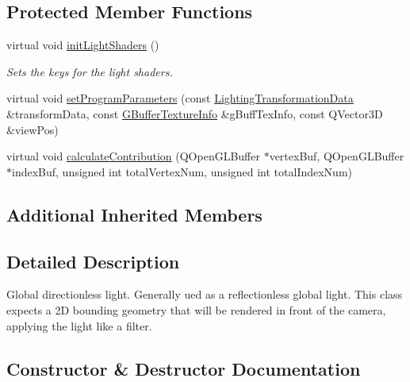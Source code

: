 \subsection*{Protected Member Functions}
\begin{DoxyCompactItemize}
\item 
\mbox{\label{class_geometry_engine_1_1_geometry_world_item_1_1_geometry_light_1_1_ambient_light_a0d27aaf4867e35c545f572ff2cf8c251}} 
virtual void \mbox{\hyperlink{class_geometry_engine_1_1_geometry_world_item_1_1_geometry_light_1_1_ambient_light_a0d27aaf4867e35c545f572ff2cf8c251}{init\+Light\+Shaders}} ()
\begin{DoxyCompactList}\small\item\em Sets the keys for the light shaders. \end{DoxyCompactList}\item 
virtual void \mbox{\hyperlink{class_geometry_engine_1_1_geometry_world_item_1_1_geometry_light_1_1_ambient_light_a37469f72317d3d9cd0e5fb46fbf5fedf}{set\+Program\+Parameters}} (const \mbox{\hyperlink{struct_geometry_engine_1_1_lighting_transformation_data}{Lighting\+Transformation\+Data}} \&transform\+Data, const \mbox{\hyperlink{struct_geometry_engine_1_1_g_buffer_texture_info}{G\+Buffer\+Texture\+Info}} \&g\+Buff\+Tex\+Info, const Q\+Vector3D \&view\+Pos)
\item 
virtual void \mbox{\hyperlink{class_geometry_engine_1_1_geometry_world_item_1_1_geometry_light_1_1_ambient_light_a4f1d4fb9ad25626e15c28de03b610b4f}{calculate\+Contribution}} (Q\+Open\+G\+L\+Buffer $\ast$vertex\+Buf, Q\+Open\+G\+L\+Buffer $\ast$index\+Buf, unsigned int total\+Vertex\+Num, unsigned int total\+Index\+Num)
\end{DoxyCompactItemize}
\subsection*{Additional Inherited Members}


\subsection{Detailed Description}
Global directionless light. Generally ued as a reflectionless global light. This class expects a 2D bounding geometry that will be rendered in front of the camera, applying the light like a filter. 

\subsection{Constructor \& Destructor Documentation}
\mbox{\label{class_geometry_engine_1_1_geometry_world_item_1_1_geometry_light_1_1_ambient_light_af3902ecbb80cd014695d3ecfc35ace18}} 
